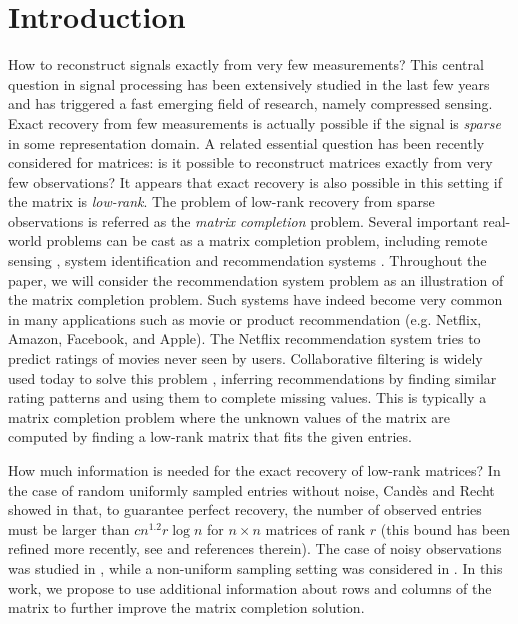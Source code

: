 \documentclass{article}
\begin{document}
\section{Introduction}
\vspace{-0.2cm}
How to reconstruct signals exactly from very few measurements? This central question in signal processing has been extensively studied in the last few years and has triggered a fast emerging field of research, namely compressed sensing. Exact recovery from few measurements is actually possible if the signal is {\it sparse} in some representation domain. A related essential question has been recently considered for matrices: is it possible to reconstruct matrices exactly from very few observations? It appears that exact recovery is also possible in this setting if the matrix is {\it low-rank}. The problem of low-rank recovery from sparse observations is referred as the {\it matrix completion} problem. Several important real-world problems can be cast as a matrix completion problem, including remote sensing \cite{art:Schmidt86RemoteSensing}, system identification \cite{art:LiuVandenberghe09SysIden} and recommendation systems \cite{srebro2004maximum}. Throughout the paper, we will consider the recommendation system problem as an illustration of the matrix completion problem.
Such systems have indeed become very common in many applications such as movie or product recommendation (e.g. Netflix, Amazon, Facebook, and Apple). 
%
The Netflix recommendation system tries to predict ratings of movies never seen by users. Collaborative filtering is widely used today to solve this problem \cite{breese1998empirical}, inferring recommendations by finding similar rating patterns and using them to complete missing values. This is typically a matrix completion problem where the unknown values of the matrix are computed by finding a low-rank matrix that fits the given entries.

How much information is needed for the exact recovery of low-rank matrices? 
In the case of random uniformly sampled entries without noise, Cand{\`e}s and Recht showed in \cite{candes2009exact} that, to guarantee perfect recovery, the number of observed entries must be larger than $c n^{1.2}r\log n$ for $n\times n$ matrices of rank $r$ (this bound has been refined more recently, see \cite{recht2011simpler} and references therein). 
%
The case of noisy observations was studied in \cite{candes2010matrix,negahban2012restricted}, while a non-uniform sampling setting was considered in \cite{salakhutdinov2010collaborative}. 
%
%
In this work, we propose to use additional information about rows and columns of the matrix to further improve the matrix completion solution.
\end{document}
